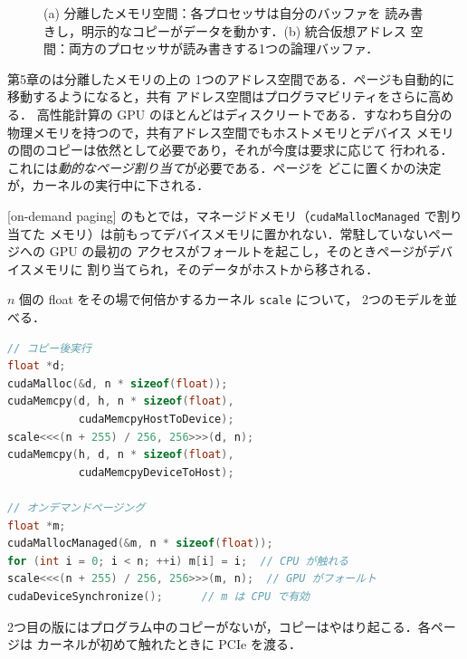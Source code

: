 \documentclass[../main.tex]{subfiles}
\begin{document}
\begin{figure}[tb]
  \centering
  
  \caption{(a) 分離したメモリ空間：各プロセッサは自分のバッファを
    読み書きし，明示的なコピーがデータを動かす．(b) 統合仮想アドレス
    空間：両方のプロセッサが読み書きする1つの論理バッファ．}
  \label{fig:l07-uva}
\end{figure}

第5章のは分離したメモリの上の
1つのアドレス空間である．ページも自動的に移動するようになると，共有
アドレス空間はプログラマビリティをさらに高める．
高性能計算の GPU のほとんどはディスクリートである．すなわち自分の
物理メモリを持つので，共有アドレス空間でもホストメモリとデバイス
メモリの間のコピーは依然として必要であり，それが今度は要求に応じて
行われる．これには\emph{動的なページ割り当て}が必要である．ページを
どこに置くかの決定が，カーネルの実行中に下される．

\begin{definition}[オンデマンドページング]
  \label{def:l07-on-demand}
  [on-demand paging]
  のもとでは，マネージドメモリ（\texttt{cudaMallocManaged} で割り当てた
  メモリ）は前もってデバイスメモリに置かれない．常駐していないページへの GPU の最初の
  アクセスがフォールトを起こし，そのときページがデバイスメモリに
  割り当てられ，そのデータがホストから移される．
\end{definition}

$n$ 個の float をその場で何倍かするカーネル \texttt{scale} について，
2つのモデルを並べる．

\begin{lstlisting}[language=C++, numbers=none]
// コピー後実行
float *d;
cudaMalloc(&d, n * sizeof(float));
cudaMemcpy(d, h, n * sizeof(float),
           cudaMemcpyHostToDevice);
scale<<<(n + 255) / 256, 256>>>(d, n);
cudaMemcpy(h, d, n * sizeof(float),
           cudaMemcpyDeviceToHost);

// オンデマンドページング
float *m;
cudaMallocManaged(&m, n * sizeof(float));
for (int i = 0; i < n; ++i) m[i] = i;  // CPU が触れる
scale<<<(n + 255) / 256, 256>>>(m, n);  // GPU がフォールト
cudaDeviceSynchronize();      // m は CPU で有効
\end{lstlisting}

%
2つ目の版にはプログラム中のコピーがないが，コピーはやはり起こる．各ページは
カーネルが初めて触れたときに PCIe を渡る．
\end{document}
